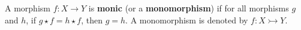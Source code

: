 \begin{definition}
    \label{def:cat:homo}
    A morphism \( f : X \to Y \) is \textbf{monic} (or a \textbf{monomorphism}) if for all morphisms \( g \) and \( h \), if \( g \star f = h \star f \), then \( g = h \). A monomorphism is denoted by \( f : X \rightarrowtail Y \).
\end{definition} 